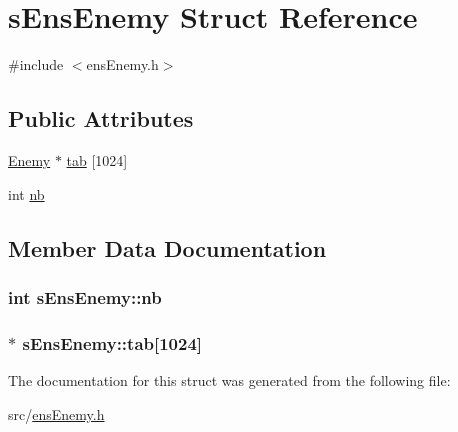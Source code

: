 \hypertarget{structs_ens_enemy}{\section{s\-Ens\-Enemy Struct Reference}
\label{structs_ens_enemy}
}


{\ttfamily \#include $<$ens\-Enemy.\-h$>$}

\subsection*{Public Attributes}
\begin{DoxyCompactItemize}
\item 
\hyperlink{enemy_8h_ae3ac1c5e4d43de724487dfc83b509fd4}{Enemy} $\ast$ \hyperlink{structs_ens_enemy_ae686821bfd277f8c2bfd13cc00499656}{tab} \mbox{[}1024\mbox{]}
\item 
int \hyperlink{structs_ens_enemy_a21588de03e02330a540a0b7927f1a70b}{nb}
\end{DoxyCompactItemize}


\subsection{Member Data Documentation}
\hypertarget{structs_ens_enemy_a21588de03e02330a540a0b7927f1a70b}{
\subsubsection[{nb}]{\setlength{\rightskip}{0pt plus 5cm}int s\-Ens\-Enemy\-::nb}}\label{structs_ens_enemy_a21588de03e02330a540a0b7927f1a70b}
\hypertarget{structs_ens_enemy_ae686821bfd277f8c2bfd13cc00499656}{
\subsubsection[{tab}]{$\ast$ s\-Ens\-Enemy\-::tab\mbox{[}1024\mbox{]}}}\label{structs_ens_enemy_ae686821bfd277f8c2bfd13cc00499656}


The documentation for this struct was generated from the following file\-:\begin{DoxyCompactItemize}
\item 
src/\hyperlink{ens_enemy_8h}{ens\-Enemy.\-h}\end{DoxyCompactItemize}

